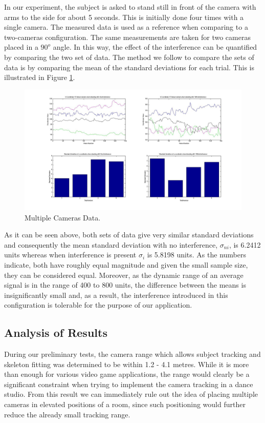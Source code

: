 \documentclass[10pt,a4paper]{article}
\begin{document}
\noindent
In our experiment, the subject is asked to stand still in front of the camera with arms to the side for about 5 seconds. This is initially done four times with a single camera. The measured data is used as a reference when comparing to a two-cameras configuration. The same measurements are taken for two cameras placed in a $90^o$ angle. In this way, the effect of the interference can be quantified by comparing the two set of data. The method we follow to compare the sets of data is by comparing the mean of the standard deviations for each trial. This is illustrated in Figure \ref{Multiple_Std}. 
 
\begin{figure}[H]
\centering
\includegraphics[scale=0.3]{Multiple_Cameras_Std.jpg}
\caption{Multiple Cameras Data.} %
\label{Multiple_Std}
\end{figure}

\noindent
As it can be seen above, both sets of data give very similar standard deviations and consequently the mean standard deviation with no interference, $\sigma_{ni}$, is 6.2412 units whereas when interference is present $\sigma_{i}$ is 5.8198 units. As the numbers indicate, both have roughly equal magnitude and given the small sample size, they can be considered equal. Moreover, as the dynamic range of an average signal is in the range of 400 to 800 units, the difference between the means is insignificantly small and, as a result, the interference introduced in this configuration is tolerable for the purpose of our application.

\subsection{Analysis of Results}
\noindent
During our preliminary tests, the camera range which allows subject tracking and skeleton fitting was determined to be within 1.2 - 4.1 metres. While it is more than enough for various video game applications, the range would clearly be a significant constraint when trying to implement the camera tracking in a dance studio. From this result we can immediately rule out the idea of placing multiple cameras in elevated positions of a room, since such positioning would further reduce the already small tracking range.
\end{document}
